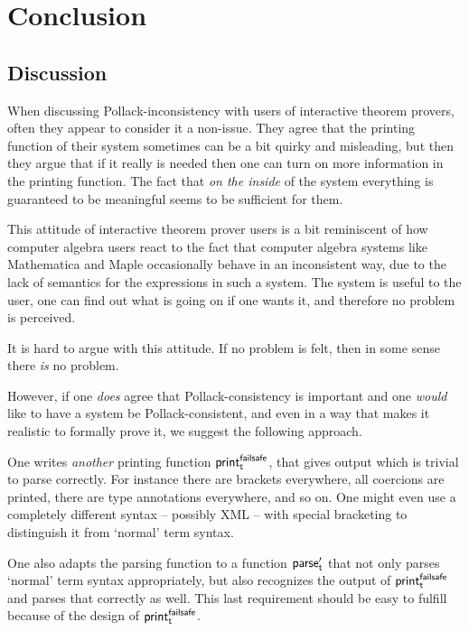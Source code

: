 \documentclass{entcs}
\begin{document}
\section{Conclusion}
\label{conclusion}

\subsection{Discussion}
\label{discussion}

When discussing Pollack-inconsistency with users of interactive
theorem prov\-ers, often they appear to consider it a non-issue.
They agree that the printing function of their system
sometimes can be a bit quirky
and misleading, but then they argue that if it really is needed then one can turn
on more information in the printing function.
The fact that \emph{on the inside} of
the system everything is guaranteed to be meaningful seems to be sufficient for them.

This attitude of interactive theorem prover users
is a bit reminiscent of how computer algebra users
react to the fact that computer algebra systems like Mathematica
and Maple occasionally behave in an inconsistent way, due to the
lack of semantics for the expressions in such a system.
The system is useful to the user, one can find out what is going on if one
wants it, and therefore no problem is perceived.

It is hard to argue with this attitude.
If no problem is felt, then in some sense there \emph{is} no problem.

However, if one \emph{does} agree that Pollack-consistency is important and
one \emph{would} like to have a system be Pollack-consistent,
and even in a way that makes it realistic to formally prove it,
we suggest the following approach.

One writes \emph{another} printing function ${\sf print}_{\sf t}^{\sf failsafe}$, that gives
output which is trivial to parse correctly.
For instance there are brackets everywhere, all coercions are printed,
there are type annotations everywhere, and so on.
One might even use a completely different syntax -- possibly {\small XML} --
with special bracketing to distinguish it from `normal' term syntax.

One also adapts the parsing function to a function ${\sf parse}'_{\sf t}$ that not only parses
`normal' term syntax appropriately, but also recognizes the output
of ${\sf print}_{\sf t}^{\sf failsafe}$ and parses that correctly as well.
This last requirement should be easy to fulfill because of the design of
${\sf print}_{\sf t}^{\sf failsafe}$.
\end{document}
